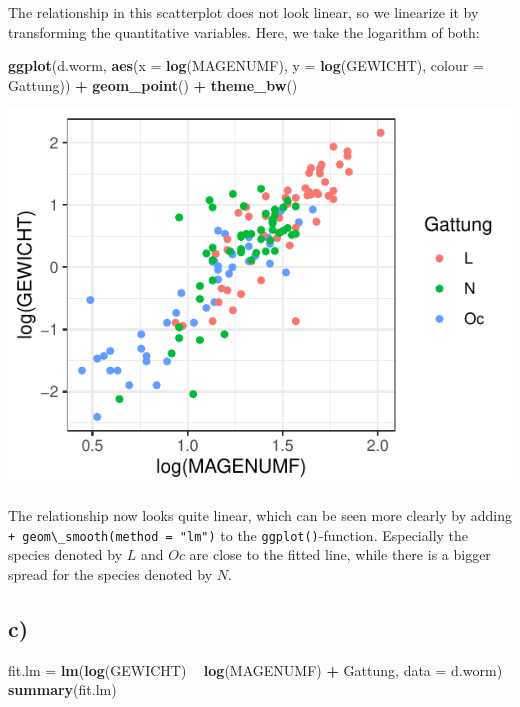 \documentclass[
]{article}
\newenvironment{Shaded}{\begin{snugshade}}{\end{snugshade}}
\newcommand{\DataTypeTok}[1]{\textcolor[rgb]{0.13,0.29,0.53}{#1}}
\newcommand{\KeywordTok}[1]{\textcolor[rgb]{0.13,0.29,0.53}{\textbf{#1}}}
\newcommand{\NormalTok}[1]{#1}
\newcommand{\OperatorTok}[1]{\textcolor[rgb]{0.81,0.36,0.00}{\textbf{#1}}}
\newcommand{\StringTok}[1]{\textcolor[rgb]{0.31,0.60,0.02}{#1}}
\begin{document}
The relationship in this scatterplot does not look linear, so we
linearize it by transforming the quantitative variables. Here, we take
the logarithm of both:

\begin{Shaded}
\begin{Highlighting}[]
\KeywordTok{ggplot}\NormalTok{(d.worm, }\KeywordTok{aes}\NormalTok{(}\DataTypeTok{x =} \KeywordTok{log}\NormalTok{(MAGENUMF), }\DataTypeTok{y =} \KeywordTok{log}\NormalTok{(GEWICHT), }\DataTypeTok{colour =}\NormalTok{ Gattung)) }\OperatorTok{+}\StringTok{ }\KeywordTok{geom_point}\NormalTok{() }\OperatorTok{+}\StringTok{ }
\StringTok{    }\KeywordTok{theme_bw}\NormalTok{()}
\end{Highlighting}
\end{Shaded}

\includegraphics{Project_1_files/figure-latex/unnamed-chunk-4-1.pdf}

The relationship now looks quite linear, which can be seen more clearly
by adding \texttt{+\ geom\textbackslash{}\_smooth(method\ =\ "lm")} to
the \texttt{ggplot()}-function. Especially the species denoted by \(L\)
and \(Oc\) are close to the fitted line, while there is a bigger spread
for the species denoted by \(N\).

\hypertarget{c-1}{%
\subsection{c)}\label{c-1}}

\begin{Shaded}
\begin{Highlighting}[]
\NormalTok{fit.lm =}\StringTok{ }\KeywordTok{lm}\NormalTok{(}\KeywordTok{log}\NormalTok{(GEWICHT) }\OperatorTok{~}\StringTok{ }\KeywordTok{log}\NormalTok{(MAGENUMF) }\OperatorTok{+}\StringTok{ }\NormalTok{Gattung, }\DataTypeTok{data =}\NormalTok{ d.worm)}
\KeywordTok{summary}\NormalTok{(fit.lm)}
\end{Highlighting}
\end{Shaded}
\end{document}
